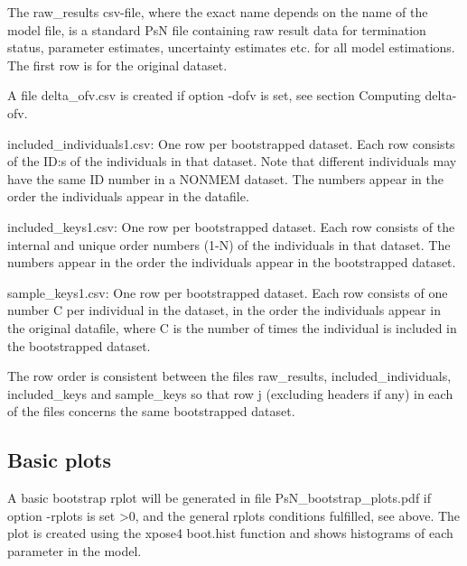 The raw\_results csv-file, where the exact name depends on the name of the model file, 
is a standard PsN file containing raw result data for termination status, parameter estimates, uncertainty estimates etc. for all model estimations. 
The first row is for the original dataset.

A file delta\_ofv.csv is created if option -dofv is set, see section Computing delta-ofv.

included\_individuals1.csv: One row per bootstrapped dataset. Each row consists of the ID:s of the individuals in that dataset. Note that different individuals may have the same ID number in a NONMEM dataset. The numbers appear in the order the individuals appear in the datafile.

included\_keys1.csv: One row per bootstrapped dataset. Each row consists of the internal and unique order numbers (1-N) of the individuals in that dataset. The numbers appear in the order the individuals appear in the bootstrapped dataset. 

sample\_keys1.csv:  One row per bootstrapped dataset. Each row consists of one number C per individual in the dataset, in the order the individuals appear in the original datafile, where C is the number of times the individual is included in the bootstrapped dataset. 

The row order is consistent between the files raw\_results, included\_individuals, included\_keys and sample\_keys so that row j (excluding headers if any) in each of the files concerns the same bootstrapped dataset.

\subsection{Basic plots}
A basic bootstrap rplot will be generated in file PsN\_bootstrap\_plots.pdf
if option -rplots is set >0,
and the general rplots conditions fulfilled, see above.
The plot is created using the xpose4 boot.hist function
and shows histograms of each parameter in the model.

